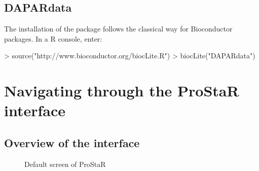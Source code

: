 \documentclass[12pt]{article}
\begin{document}
        
\subsection{DAPARdata}\label{sec:DAPARdata}

The installation of the package  follows 
the classical way for Bioconductor packages. In a R console, enter:
\begin{Schunk}
\begin{Sinput}
> source("http://www.bioconductor.org/biocLite.R")
> biocLite("DAPARdata")
\end{Sinput}
\end{Schunk}


\section{Navigating through the ProStaR interface}

\subsection{Overview of the interface}

\begin{figure}
\centering
{}
\caption{Default screen of ProStaR}\label{fig:vuegal}
\end{figure}
\end{document}
